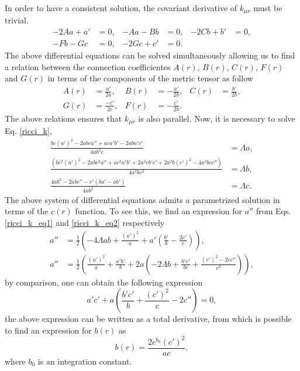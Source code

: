 \documentclass{article}
\begin{document}
In order to have a consistent solution, the covariant
derivative of $k_{\mu\nu}$ must be trivial. 
\begin{align}
    -2Aa + a' & = 0, & -Aa - Bb  & = 0, & -2Cb + b' & = 0, \\
    -Fb - Gc  & = 0, & -2Gc + c' & = 0.
\end{align}
The above differential equations can be solved simultaneously allowing us to find
a relation between the connection coefficientes $A(r)$, $B(r)$, $C(r)$, $F(r)$ and $G(r)$
in terms of the components of the metric tensor as follow
\begin{align}
    A(r) & = \frac{a'}{2a}, & B(r) & =  -\frac{a'}{2b}, & C(r) & = \frac{b'}{2b}, \\
    G(r) & = \frac{-c'}{2c}, & F(r) & = -\frac{c'}{2b}.
\end{align}
The above relations ensures that $k_{\mu\nu}$ is also parallel. Now, it is necessary
to solve Eq. \eqref{ricci_k}, 
\begin{align}
\frac{bc(a')^2 - 2abca'' + aca'b' - 2aba'c'}{4ab^2 c} & = \Lambda a, \label{ricci_k_eq1} \\
\frac{\left(bc^2(a')^2 - 2abc^2a'' + ac^2a'b' + 2a^2cb'c' + 2a^2b(c')^2 - 4a^2bcc''\right)}{4a^2bc^2} & = \Lambda b, \label{ricci_k_eq2} \\
\frac{4ab^2 - 2abc'' - c'\left(ba' - ab'\right)}{4ab^2} & = \Lambda c. \label{ricci_k_eq3}
\end{align}
The above system of differential equations admits a parametrized solution in terms
of the $c(r)$ function. To see this, we find an expression for $a''$ from Eqs. \eqref{ricci_k_eq1}
and \eqref{ricci_k_eq2} respectively
\begin{align}
    a'' & = \frac{1}{2}\left(-4\Lambda ab + \frac{(a')^2}{a} + a'\left(\frac{b'}{b} - \frac{2c'}{c}\right)\right), \\
    a'' & = \frac{1}{2}\left(\frac{(a')^2}{a} + \frac{a'b'}{b} + 2a\left(-2\Lambda b + \frac{b'c'}{bc} + \frac{(c')^2 - 2cc''}{c^2}\right)\right),
\end{align}
by comparison, one can obtain the following expression
\begin{equation}
    a'c' + a\left(\frac{b'c'}{b} + \frac{(c')^2}{c} - 2c''\right) = 0,
\end{equation}
the above expression can be written as a total derivative, from which is
possible to find an expression for $b(r)$ as
\begin{equation}
    b(r) = \frac{2e^{b_0}(c')^2}{ac},
\end{equation}
where $b_0$ is an integration constant.
\end{document}
